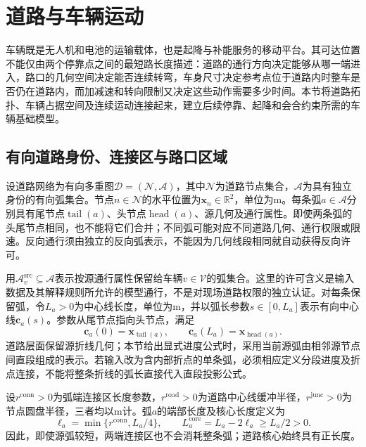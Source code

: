 \section{道路与车辆运动}
\label{sec:04_07}

车辆既是无人机和电池的运输载体，也是起降与补能服务的移动平台。其可达位置不能仅由两个停靠点之间的最短路长度描述：道路的通行方向决定能够从哪一端进入，路口的几何空间决定能否连续转弯，车身尺寸决定参考点位于道路内时整车是否仍在道路内，而加减速和转向限制又决定这些动作需要多少时间。本节将道路拓扑、车辆占据空间及连续运动连接起来，建立后续停靠、起降和会合约束所需的车辆基础模型。

\subsection{有向道路身份、连接区与路口区域}

设道路网络为有向多重图$\mathcal D=(\mathcal N,\mathcal A)$，其中$\mathcal N$为道路节点集合，$\mathcal A$为具有独立身份的有向弧集合。节点$n\in\mathcal N$的水平位置为$\mathbf x_n\in\mathbb R^2$，单位为$\mathrm m$。每条弧$a\in\mathcal A$分别具有尾节点$\operatorname{tail}(a)$、头节点$\operatorname{head}(a)$、源几何及通行属性。即使两条弧的头尾节点相同，也不能将它们合并；不同弧可能对应不同道路几何、通行权限或限速。反向通行须由独立的反向弧表示，不能因为几何线段相同就自动获得反向许可。

用$\mathcal A_v^{\mathrm{src}}\subseteq\mathcal A$表示按源通行属性保留给车辆$v\in\mathcal V$的弧集合。这里的许可含义是输入数据及其解释规则所允许的模型通行，不是对现场道路权限的独立认证。对每条保留弧，令$L_a>0$为中心线长度，单位为$\mathrm m$，并以弧长参数$s\in[0,L_a]$表示有向中心线$\mathbf c_a(s)$。参数从尾节点指向头节点，满足
\begin{equation}
 \mathbf c_a(0)=\mathbf x_{\operatorname{tail}(a)},\qquad
 \mathbf c_a(L_a)=\mathbf x_{\operatorname{head}(a)}.
 \label{s0407:arc_endpoints}
\end{equation}
道路层面保留源折线几何；本节给出显式进度公式时，采用当前源弧由相邻源节点间直段组成的表示。若输入改为含内部折点的单条弧，必须相应定义分段进度及折点连接，不能将整条折线的弧长直接代入直段投影公式。

设$r^{\mathrm{conn}}>0$为弧端连接区长度参数，$r^{\mathrm{road}}>0$为道路中心线缓冲半径，$r^{\mathrm{junc}}>0$为节点圆盘半径，三者均以$\mathrm m$计。弧$a$的端部长度及核心长度定义为
\begin{equation}
 \ell_a=\min\{r^{\mathrm{conn}},L_a/4\},\qquad
 L_a^{\mathrm{core}}=L_a-2\ell_a\ge L_a/2>0.
 \label{s0407:connector_length}
\end{equation}
因此，即使源弧较短，两端连接区也不会消耗整条弧；道路核心始终具有正长度。

